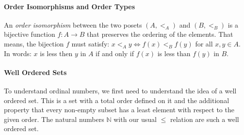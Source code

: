 \paragraph{Order Isomorphisms and Order Types}
An \emph{order isomorphism} between the two posets $(A, <_A)$ and $(B, <_B)$ is a bijective function $f: A \rightarrow B$ that preserves the ordering of the elements. That means, the bijection $f$ must satisfy: $x <_A y \Leftrightarrow f(x) <_B f(y)$ for all $x,y \in A$. In words: $x$ is less then $y$ in $A$ if and only if $f(x)$ is less than $f(y)$ in $B$. 







\paragraph{Well Ordered Sets} To understand ordinal numbers, we first need to understand the idea of a well ordered set. This is a set with a total order defined on it and the additional property that every non-empty subset has a least element with respect to the given order. The natural numbers $\mathbb{N}$ with our usual $\leq$ relation are such a well ordered set. 

